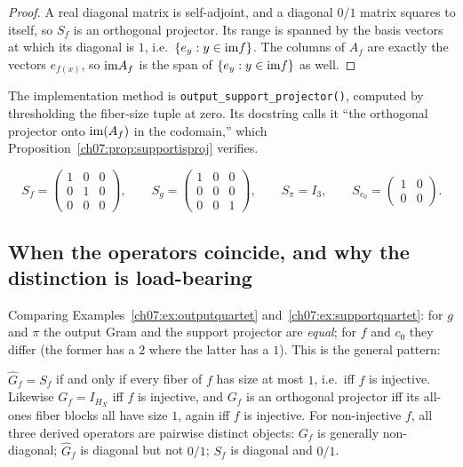 \begin{proof}
A real diagonal matrix is self-adjoint, and a diagonal $0/1$ matrix squares
to itself, so $S_f$ is an orthogonal projector. Its range is spanned by the
basis vectors at which its diagonal is $1$, i.e.\ $\{e_y: y\in\mathrm{im} f\}$. The
columns of $A_f$ are exactly the vectors $e_{f(x)}$, so $\mathrm{im} A_f$ is the span
of $\{e_y : y \in \mathrm{im} f\}$ as well.
\end{proof}

The implementation method is \texttt{output\_support\_projector()}, computed
by thresholding the fiber-size tuple at zero. Its docstring calls it ``the
orthogonal projector onto $\mathrm{im}(A_f)$ in the codomain,'' which
Proposition~\ref{ch07:prop:supportisproj} verifies.

\begin{example}\label{ch07:ex:supportquartet}
\[
S_f=\begin{pmatrix}1&0&0\\0&1&0\\0&0&0\end{pmatrix},\qquad
S_g=\begin{pmatrix}1&0&0\\0&0&0\\0&0&1\end{pmatrix},\qquad
S_\pi=I_3,\qquad
S_{c_0}=\begin{pmatrix}1&0\\0&0\end{pmatrix}.
\]
\end{example}

\subsection{When the operators coincide, and why the distinction is load-bearing}

Comparing Examples~\ref{ch07:ex:outputquartet}
and~\ref{ch07:ex:supportquartet}: for $g$ and $\pi$ the output Gram and the
support projector are \emph{equal}; for $f$ and $c_0$ they differ (the
former has a $2$ where the latter has a $1$). This is the general pattern:

\begin{proposition}\label{ch07:prop:coincide}
$\widehat{G}_f=S_f$ if and only if every fiber of $f$ has size at most $1$,
i.e.\ iff $f$ is injective. Likewise $G_f=I_{H_X}$ iff $f$ is injective, and
$G_f$ is an orthogonal projector iff its all-ones fiber blocks all have size
$1$, again iff $f$ is injective. For non-injective $f$, all three derived
operators are pairwise distinct objects: $G_f$ is generally non-diagonal;
$\widehat{G}_f$ is diagonal but not $0/1$; $S_f$ is diagonal and $0/1$.
\end{proposition}

